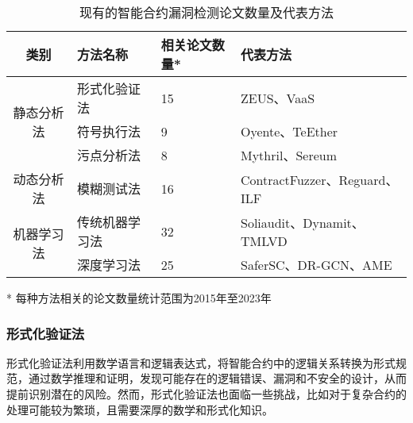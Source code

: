 \begin{table}[htbp]
    \caption{\label{tab:defect_detection_methods}现有的智能合约漏洞检测论文数量及代表方法}
    \small
    \begin{threeparttable}
        {
            \renewcommand{\arraystretch}{1.5}
        \begin{tabularx}{\linewidth}{cp{3cm}<{\centering}p{3cm}<{\centering}X<{\centering}}
            \toprule
            类别                     & 方法名称   & 相关论文数量* & 代表方法 \\ \midrule
            \multirow{3}{*}{静态分析法} & 形式化验证法 & 15    & ZEUS\cite{kalra2018zeus}、VaaS\cite{garfatta2021survey}  \\
                                   & 符号执行法  & 9    & Oyente\cite{luu2016making}、TeEther\cite{krupp2018teether}  \\
                                   & 污点分析法  & 8    & Mythril\cite{mythril}、Sereum\cite{rodler2018sereum}  \\ \midrule
            动态分析法                  & 模糊测试法  & 16    & ContractFuzzer\cite{jiang2018contractfuzzer}、Reguard\cite{liu2018reguard}、ILF\cite{he2019learning}  \\ \midrule
            \multirow{2}{*}{机器学习法} & 传统机器学习法  & 32    & Soliaudit\cite{liao2019soliaudit}、Dynamit\cite{Dynamit}、TMLVD\cite{TMLVD}  \\
                                   & 深度学习法  & 25    & SaferSC\cite{tann2018towards}、DR-GCN\cite{zhuang2021smart}、AME\cite{liu2021smart}  \\ \bottomrule
        \end{tabularx}
        }
        \begin{tablenotes}
            \footnotesize
            \item[*] 每种方法相关的论文数量统计范围为2015年至2023年
        \end{tablenotes}
    \end{threeparttable}
\end{table}

\subsubsection{形式化验证法}
    
    形式化验证法利用数学语言和逻辑表达式，将智能合约中的逻辑关系转换为形式规范，通过数学推理和证明，发现可能存在的逻辑错误、漏洞和不安全的设计，从而提前识别潜在的风险。然而，形式化验证法也面临一些挑战，比如对于复杂合约的处理可能较为繁琐，且需要深厚的数学和形式化知识。
    
